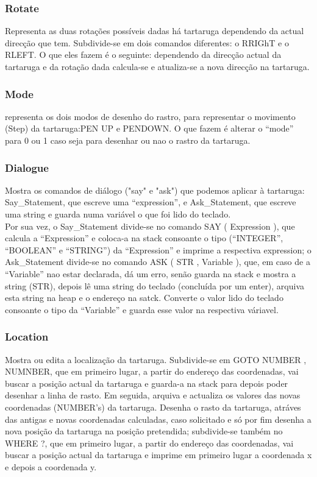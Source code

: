\documentclass[12pt,a4paper,oneside]{article}
\newenvironment{codefold}{}{}
\begin{document}
\begin{codefold}
    \subsubsection{Rotate}

\indent Representa as duas rotações possíveis dadas há tartaruga dependendo da actual direcção que tem. Subdivide-se em dois comandos diferentes: o RRIGhT e o RLEFT. O que
eles fazem é o seguinte: dependendo da direcção actual da tartaruga e da rotação dada calcula-se e atualiza-se a nova direcção na tartaruga.\\
  
    \subsubsection{Mode}

\indent representa os dois modos de desenho do rastro, para representar o movimento (Step) da tartaruga:PEN UP e PENDOWN. O que fazem é alterar o ``mode'' para 0 ou 1
caso seja para desenhar ou nao o rastro da tartaruga.\\

    \subsubsection{Dialogue}

\indent Mostra os comandos de diálogo ("say" e "ask") que podemos aplicar à tartaruga: Say\_Statement, que escreve uma ``expression'', e Ask\_Statement, que escreve uma
string e guarda numa variável o que foi lido do teclado.\\
\indent Por sua vez, o Say\_Statement divide-se no comando SAY ( Expression ), que calcula a ``Expression'' e coloca-a na stack consoante o tipo (``INTEGER'', ``BOOLEAN''
e ``STRING'') da ``Expression'' e imprime a respectiva expression; o Ask\_Statement divide-se no comando ASK ( STR , Variable ), que, em caso de a ``Variable'' nao estar
declarada, dá um erro, senão guarda na stack e mostra a string (STR), depois lê uma string do teclado (concluída por um enter), arquiva esta string na heap e o endereço
na satck. Converte o valor lido do teclado consoante o tipo da ``Variable'' e guarda esse valor na respectiva váriavel.

    \subsubsection{Location}

\indent Mostra ou edita a localização da tartaruga. Subdivide-se em GOTO NUMBER , NUMNBER, que em primeiro lugar, a partir do endereço das coordenadas, vai buscar a
posição actual da tartaruga e guarda-a na stack para depois poder desenhar a linha de rasto. Em seguida, arquiva e actualiza os valores das novas coordenadas (NUMBER's)
da tartaruga. Desenha o rasto da tartaruga, atráves das antigas e novas coordenadas calculadas, caso solicitado e só por fim desenha a nova posição da tartaruga na
posição pretendida; subdivide-se também no WHERE ?, que em primeiro lugar, a partir do endereço das coordenadas, vai buscar a posição actual da tartaruga e imprime em
primeiro lugar a coordenada x e depois a coordenada y.




\end{codefold}
\end{document}
